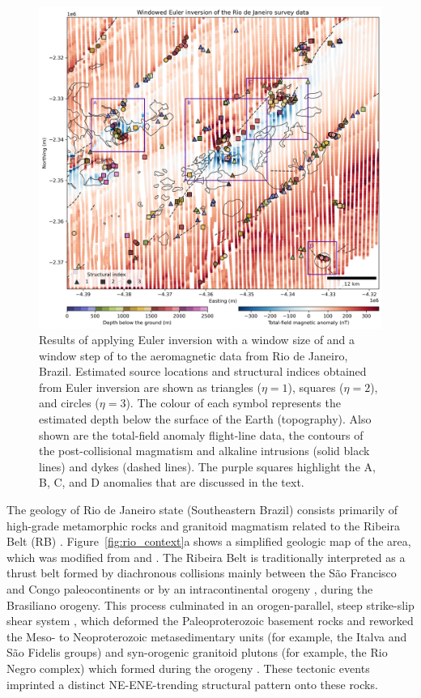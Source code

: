 \begin{figure}[tb!]
\centering
\includegraphics[width=1\linewidth]{figures/real-data-application.png}
\caption{
    Results of applying Euler inversion with a window size of \RioWindowSize{} and a window step of \RioWindowStep{} to the aeromagnetic data from Rio de Janeiro, Brazil.
    Estimated source locations and structural indices obtained from Euler inversion are shown as triangles ($\eta=1$), squares ($\eta=2$), and circles ($\eta=3$).
    The colour of each symbol represents the estimated depth below the surface of the Earth (topography).
    Also shown are the total-field anomaly flight-line data, the contours of the post-collisional magmatism and alkaline intrusions (solid black lines) and dykes (dashed lines).
    The purple squares highlight the A, B, C, and D anomalies that are discussed in the text.
}
\label{fig:rio_results}
\end{figure}

The geology of Rio de Janeiro state (Southeastern Brazil) consists primarily of
high-grade metamorphic rocks and granitoid magmatism related to the Ribeira
Belt (RB) \citep{Heilbron2020}.
Figure~\ref{fig:rio_context}a shows a simplified geologic map of the area, which was modified from \citet{Heilbron2016} and \citet{Dantas2017}.
The Ribeira Belt is traditionally interpreted as a thrust
belt formed by diachronous collisions mainly between the São Francisco and
Congo paleocontinents \citep{Heilbron2008, Trouw2000} or by an intracontinental
orogeny \citep[\textit{e.g.}][]{Meira2015, Meira2019}, during the Brasiliano
orogeny. This process culminated in an orogen-parallel, steep strike-slip shear
system \citep{EgydioSilva2005}, which deformed the Paleoproterozoic basement
rocks and reworked the Meso- to Neoproterozoic metasedimentary units (for example, the
Italva and São Fidelis groups) and syn-orogenic granitoid plutons (for example, the Rio
Negro complex) which formed during the orogeny \citep{Heilbron2003, Heilbron2020}.
These tectonic events imprinted a distinct NE-ENE-trending structural pattern
onto these rocks.


